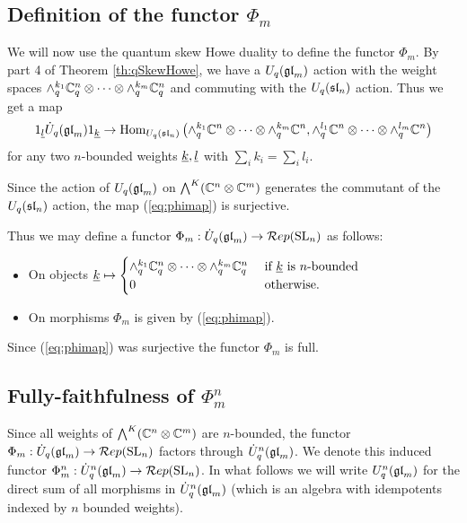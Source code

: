 \documentclass[11pt,leqno]{article}
\begin{document}
\subsection{Definition of the functor $\Phi_m$}

We will now use the quantum skew Howe duality to define the functor $\Phi_m$. By part 4 of Theorem \ref{th:qSkewHowe}, we have a $U_q(\gl_m)$ action with the weight spaces $\alt^{k_1}_q \mathbb C_q^n \otimes \cdots \otimes \alt^{k_m}_q \mathbb C_q^n$ and commuting with the $U_q(\sl_n)$ action. Thus we get a map
\begin{equation}\label{eq:phimap}
\one_\ul{l} \dU(\gl_m) \one_\ul{k} \rightarrow \Hom_{U_q(\sl_n)} \left(\alt^{k_1}_q \mathbb C^n \otimes \cdots \otimes \alt^{k_m}_q \mathbb C^n, \alt^{l_1}_q \mathbb C^n \otimes \cdots \otimes \alt^{l_m}_q \mathbb C^n\right)
\end{equation}
for any two $n$-bounded weights $\ul{k}, \ul{l}$ with $\sum_i k_i = \sum_i l_i $.

Since the action of $U_q(\gl_m)$  on $\Alt^K(\mathbb C^n \otimes \mathbb C^m) $ generates the commutant of the $U_q(\sl_n)$ action, the map (\ref{eq:phimap}) is surjective.

Thus we may define a functor $\Phi_m: \dU(\gl_m) \rightarrow \Rep(\SL_n)$ as follows:
\begin{itemize}
\item On objects
$\ul{k} \mapsto
\begin{cases}
\alt^{k_1}_q \mathbb C_q^n \otimes \cdots \otimes \alt^{k_m}_q \mathbb C_q^n & \text{ if } \ul{k} \text{ is } n\text{-bounded } \\
0 & \text{ otherwise.}
\end{cases}$
\item On morphisms $ \Phi_m $ is given by (\ref{eq:phimap}).
\end{itemize}
Since (\ref{eq:phimap}) was surjective the functor $\Phi_m$ is full.

\subsection{Fully-faithfulness of $ \Phi_m^n$}
\label{sec:fully-faithful}

Since all weights of $\Alt^K(\mathbb{C}^n \otimes \mathbb{C}^m)$ are $ n$-bounded, the functor $\Phi_m: \dU(\gl_m)\rightarrow \Rep(\SL_n)$ factors through $\dU^n(\gl_m)$. We denote this induced functor $\Phi_m^n: \dU^n(\gl_m) \rightarrow \Rep(\SL_n)$. In what follows we will write $U_q^n(\gl_m)$ for the direct sum of all morphisms in $\dU^n(\gl_m)$ (which is an algebra with idempotents indexed by $n$ bounded weights). 
\end{document}
